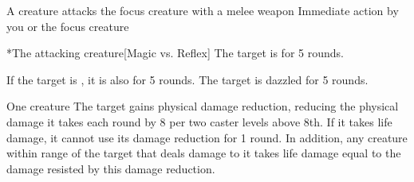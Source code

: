 \begin{spellheader}
    \spellrng{\rngclose}
\end{spellheader}
\begin{spelleffects}
    \begin{spelltrigger}{A creature attacks the focus creature with a melee weapon}
         Immediate action by you or the focus creature
        \spellrng{\rngclose}
        \begin{spelltarget}*{The attacking creature}[Magic vs. Reflex]
            \spellsuccess The target is \dazzled for 5 rounds.

            If the target is \bloodied, it is also \blinded for 5 rounds.
            \spellfailure The target is dazzled for 5 rounds.
        \end{spelltarget}
    \end{spelltrigger}
\end{spelleffects}
\begin{spellfooter}
    
\end{spellfooter}

\begin{spellheader}
    \spellrng{\rngclose}
    \spelldur{\durshort}
\end{spellheader}
\begin{spelleffects}
    \begin{spelltarget}{One creature}
        \spelleffect The target gains physical damage reduction, reducing the physical damage it takes each round by 8  per two caster levels above 8th. If it takes life damage, it cannot use its damage reduction for 1 round. In addition, any creature within \rngmed range of the target that deals damage to it takes life damage equal to the damage resisted by this damage reduction.
    \end{spelltarget}
\end{spelleffects}
\begin{spellfooter}
    
\end{spellfooter}

